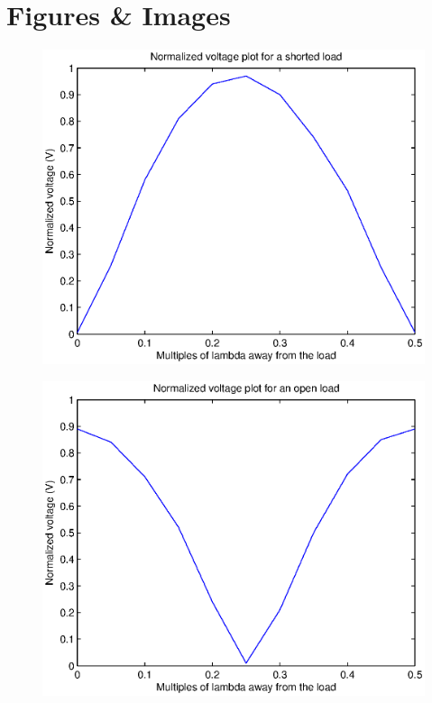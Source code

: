\documentclass{article}
\begin{document}
\section{Figures \& Images}
\begin{figure}[H]
	\centering
   	\includegraphics[scale = 0.85]{./Matlab/Short.eps}
\end{figure}
\begin{figure}[H]
	\centering
   	\includegraphics[scale = 0.85]{./Matlab/Open.eps}
\end{figure}
\end{document}
